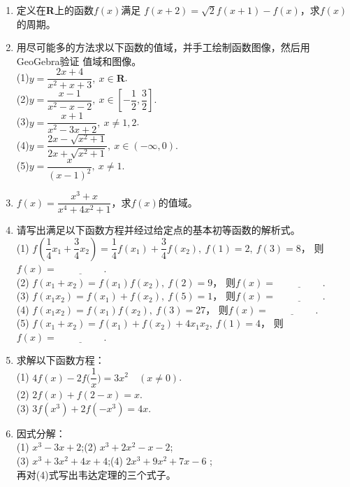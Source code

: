 \begin{enumerate}[label={\textbf{\thechapter.\arabic*}},leftmargin=
    \inteval{\myenumleftmargin}pt]
\item 定义在\textbf{R}上的函数$ f(x) $满足
$ f(x+2)=\sqrt{2}f(x+1)-f(x) $，求$ f(x) $的周期。

\item 用尽可能多的方法求以下函数的值域，并手工绘制函数图像，然后用GeoGebra验证
值域和图像。\\
(1)$ y=\dfrac{2x+4}{x^2+x+3},\ x\in \textbf{R} $. \\
(2)$ y=\dfrac{x-1}{x^2-x-2},\ x\in\left[-\dfrac{1}{2},
                            \dfrac{3}{2}\right] $. \\
(3)$ y=\dfrac{x+1}{x^2-3x+2},\ x\neq 1,2 $. \\
(4)$ y=\dfrac{2x-\sqrt{x^2+1}}{2x+\sqrt{x^2+1}},\ x\in (-\infty,0) $. \\
(5)$ y=\dfrac{x}{(x-1)^2},\ x\neq 1 $.

\item $f(x)=\dfrac{x^3+x}{x^4+4x^2+1}$，求$f(x)$的值域。

\item 请写出满足以下函数方程并经过给定点的基本初等函数的解析式。\\
(1) $ f\left(\dfrac{1}{4}x_1+\dfrac{3}{4}x_2\right)=\dfrac{1}{4}f(x_1)+
\dfrac{3}{4}f(x_2),\ f(1)=2,\ f(3)=8 $，
则$ f(x)=\underline{\hspace{2cm}} $. \\
(2) $ f(x_1+x_2)=f(x_1)f(x_2),\ f(2)=9 $，
则$ f(x)=\underline{\hspace{2cm}} $. \\
(3) $ f(x_1x_2)=f(x_1)+f(x_2),\ f(5)=1 $，
则$ f(x)=\underline{\hspace{2cm}} $. \\
(4) $ f(x_1x_2)=f(x_1)f(x_2),\ f(3)=27 $，
则$ f(x)=\underline{\hspace{2cm}} $. \\
(5) $ f(x_1+x_2)=f(x_1)+f(x_2)+4x_1x_2,\ f(1)=4 $，
则$ f(x)=\underline{\hspace{2cm}} $.

\item 求解以下函数方程：\\
(1) $ 4f(x)-2f\Big(\dfrac{1}{x}\Big)=3x^2 \quad (x\neq 0) $. \\
(2) $ 2f(x)+f(2-x)=x $.  \\
(3) $ 3f(x^3)+2f(-x^3)=4x $. 

\item 因式分解：\\ (1) $ x^3-3x+2 $;\quad (2) $ x^3 + 2x^2 - x - 2 $;  \\
(3) $ x^3 + 3x^2 + 4x + 4 $;\quad (4) $ 2x^3 + 9x^2 + 7x - 6 $ ;\\
再对(4)式写出韦达定理的三个式子。


\end{enumerate}
